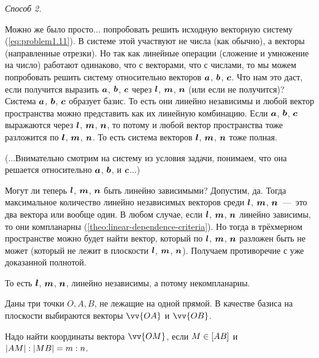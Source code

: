 \documentclass[a4paper,12pt]{article}
\begin{document}
\begin{solution}
    \bigskip
    
    \emph{Способ 2.}
    
    \medskip
    
    Можно же было просто... попробовать решить исходную векторную систему (\ref{eq:problem1.11}).
    В системе этой участвуют не числа (как обычно), а векторы (направленные отрезки).
    Но так как линейные операции (сложение и умножение на число) работают одинаково, что с векторами, что с числами, то мы можем попробовать решить систему относительно векторов $\boldsymbol a$, $\boldsymbol b$, $\boldsymbol c$.
    Что нам это даст, если получится выразить $\boldsymbol a$, $\boldsymbol b$, $\boldsymbol c$ через $\boldsymbol l$, $\boldsymbol m$, $\boldsymbol n$ (или если не получится)?
    Система $\boldsymbol a$, $\boldsymbol b$, $\boldsymbol c$ образует базис.
    То есть они линейно независимы и любой вектор пространства можно представить как их линейную комбинацию.
    Если $\boldsymbol a$, $\boldsymbol b$, $\boldsymbol c$ выражаются через $\boldsymbol l$, $\boldsymbol m$, $\boldsymbol n$, то потому и любой вектор пространства тоже разложится по $\boldsymbol l$, $\boldsymbol m$, $\boldsymbol n$.
    То есть система векторов $\boldsymbol l$, $\boldsymbol m$, $\boldsymbol n$ тоже полная.
    
    (...Внимательно смотрим на систему из условия задачи, понимаем, что она решается относительно $\boldsymbol a$, $\boldsymbol b$, и $\boldsymbol c$...)
    
    Могут ли теперь $\boldsymbol l$, $\boldsymbol m$, $\boldsymbol n$ быть линейно зависимыми?
    Допустим, да.
    Тогда максимальное количество линейно независимых векторов среди $\boldsymbol l$, $\boldsymbol m$, $\boldsymbol n$~---~это два вектора или вообще один.
    В любом случае, если $\boldsymbol l$, $\boldsymbol m$, $\boldsymbol n$ линейно зависимы, то они компланарны (\ref{theo:linear-dependence-criteria}).
    Но тогда в трёхмерном пространстве можно будет найти вектор, который по $\boldsymbol l$, $\boldsymbol m$, $\boldsymbol n$ разложен быть не может (который не лежит в плоскости $\boldsymbol l$, $\boldsymbol m$, $\boldsymbol n$).
    Получаем противоречие с уже доказанной полнотой.
    
    То есть $\boldsymbol l$, $\boldsymbol m$, $\boldsymbol n$, линейно независимы, а потому некомпланарны.
  \end{solution}
  
  
  \begin{problem}[1.24(1)]
    Даны три точки $O, A, B$, не лежащие на одной прямой.
    В качестве базиса на плоскости выбираются векторы $\vv{OA}$ и $\vv{OB}$.

    Надо найти координаты вектора $\vv{OM}$, если $M \hm\in [AB]$ и $|AM| \hm: |MB| \hm= m \hm: n$.
  \end{problem}
  
\end{document}
